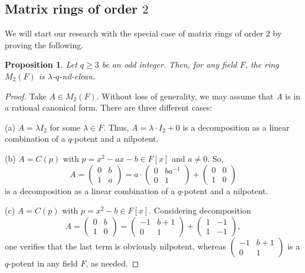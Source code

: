 \documentclass{amsart}
\newtheorem{proposition}[theorem]{Proposition}
\theoremstyle{definition}
\theoremstyle{remark}
\numberwithin{equation}{section}
\begin{document}
\subsection{Matrix rings of order $2$}

We will start our research with the special case of matrix rings of order $2$ by proving the following.

\begin{proposition}\label{lambda-odd-N-M2}
Let $q \geq 3$ be an odd integer. Then, for any field $F$, the ring $M_{2}(F)$ is $\lambda$-$q$-nil-clean.
\end{proposition}

\begin{proof}
Take $A \in M_{2}(F)$. Without loss of generality, we may assume that $A$ is in a rational canonical form. There are three different cases:

\medskip

(a) $A = \lambda I_{2}$ for some $\lambda \in F$. Thus, $A = \lambda \cdot I_{2} + 0$ is a decomposition as a linear combination of a $q$-potent and a nilpotent.

\medskip

(b) $A = C(p)$ with $p = x^{2} - ax - b \in F[x]$ and $a \not = 0$. So,
\[
  A =
  \left(
  \begin{array}{cc}
  0 & b
  \\
  1 & a
  \end{array}
  \right)
  =
  a \cdot
  \left(
  \begin{array}{cc}
  0 & ba^{-1}
  \\
  0 & 1
  \end{array}
  \right)
  +
  \left(
  \begin{array}{cc}
  0 & 0
  \\
  1 & 0
  \end{array}
  \right)
\]
is a decomposition as a linear combination of a $q$-potent and a nilpotent.

\medskip

(c) $A = C(p)$ with $p = x^{2} - b \in F[x]$. Considering decomposition
\[
  A =
  \left(
  \begin{array}{cc}
  0 & b
  \\
  1 & 0
  \end{array}
  \right)
  =
  \left(
  \begin{array}{cc}
  -1 & b+1
  \\
  0 & 1
  \end{array}
  \right)
  +
  \left(
  \begin{array}{cc}
  1 & -1
  \\
  1 & -1
  \end{array}
  \right),
\]
one verifies that the last term is obviously nilpotent, whereas
$
\begin{pmatrix}
  -1 & b+1
  \\
  0 & 1
\end{pmatrix}
$
is a $q$-potent in any field $F$, as needed.
\end{proof}
\end{document}

